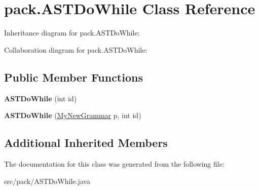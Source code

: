 \hypertarget{classpack_1_1_a_s_t_do_while}{}\section{pack.\+A\+S\+T\+Do\+While Class Reference}
\label{classpack_1_1_a_s_t_do_while}


Inheritance diagram for pack.\+A\+S\+T\+Do\+While\+:


Collaboration diagram for pack.\+A\+S\+T\+Do\+While\+:
\subsection*{Public Member Functions}
\begin{DoxyCompactItemize}
\item 
{\bfseries A\+S\+T\+Do\+While} (int id)\hypertarget{classpack_1_1_a_s_t_do_while_a7f21bed5f5dd73fa4cc55bae7c5f2044}{}\label{classpack_1_1_a_s_t_do_while_a7f21bed5f5dd73fa4cc55bae7c5f2044}

\item 
{\bfseries A\+S\+T\+Do\+While} (\hyperlink{classpack_1_1_my_new_grammar}{My\+New\+Grammar} p, int id)\hypertarget{classpack_1_1_a_s_t_do_while_a590dab818a141adf0baaf2f47f504a96}{}\label{classpack_1_1_a_s_t_do_while_a590dab818a141adf0baaf2f47f504a96}

\end{DoxyCompactItemize}
\subsection*{Additional Inherited Members}


The documentation for this class was generated from the following file\+:\begin{DoxyCompactItemize}
\item 
src/pack/A\+S\+T\+Do\+While.\+java\end{DoxyCompactItemize}
